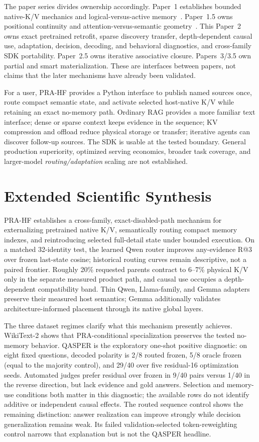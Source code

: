 \documentclass[11pt]{article}
\begin{document}
The paper series divides ownership accordingly. Paper~1 establishes bounded native-K/V
mechanics and logical-versus-active memory~\cite{simao2026pra}. Paper~1.5 owns positional
continuity and attention-versus-semantic geometry~\cite{simao2026position}. This Paper~2 owns
exact pretrained retrofit, sparse discovery transfer, depth-dependent causal use,
adaptation, decision, decoding, and behavioral diagnostics, and cross-family SDK portability. Paper~2.5 owns
iterative associative closure. Papers~3/3.5 own partial and smart materialization. These are
interfaces between papers, not claims that the later mechanisms have already been validated.

For a user, PRA-HF provides a Python interface to publish named sources once, route compact
semantic state, and activate selected host-native K/V while retaining an exact no-memory path.
Ordinary RAG provides a more familiar text interface; dense or sparse context keeps evidence in
the sequence; KV compression and offload reduce physical storage or transfer; iterative agents
can discover follow-up sources. The SDK is usable at the tested boundary. General production
superiority, optimized serving economics, broader task coverage, and larger-model
\emph{routing/adaptation} scaling are not established.

\section{Extended Scientific Synthesis}

PRA-HF establishes a cross-family, exact-disabled-path mechanism for externalizing pretrained
native K/V, semantically routing compact memory indexes, and reintroducing selected full-detail
state under bounded execution. On a matched 32-identity test, the learned Qwen router improves
any-evidence R@3 over frozen last-state cosine; historical routing curves remain descriptive,
not a paired frontier. Roughly 20\% requested parents contract to 6--7\% physical K/V only in the
separate measured product path,
and causal use occupies a depth-dependent compatibility band. Thin Qwen, Llama-family, and Gemma
adapters preserve their measured host semantics; Gemma additionally validates architecture-informed
placement through its native global layers.

The three dataset regimes clarify what this mechanism presently achieves. WikiText-2 shows that
PRA-conditional specialization preserves the tested no-memory behavior. QASPER is the exploratory
one-shot positive diagnostic: on eight fixed questions, decoded polarity is 2/8 routed frozen,
5/8 oracle frozen (equal to the majority control), and 29/40 over five residual-16 optimization
seeds. Automated judges prefer residual over frozen in 9/40 pairs versus 1/40 in the reverse
direction, but lack evidence and gold answers. Selection and memory-use conditions both matter in
this diagnostic; the available rows do not identify additive or independent causal effects. The routed
sequence control shows the remaining distinction: answer realization can improve strongly while
decision generalization remains weak. Its failed validation-selected token-reweighting control
narrows that explanation but is not the QASPER headline.
\end{document}
